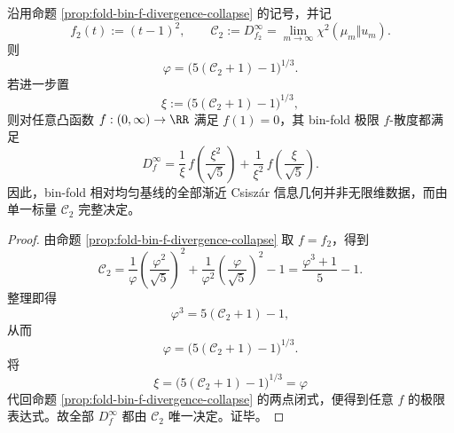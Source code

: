\begin{theorem}\label{thm:xi-chi2-complete-csiszar-geometry}
沿用命题 \ref{prop:fold-bin-f-divergence-collapse} 的记号，并记
\[
f_2(t):=(t-1)^2,
\qquad
\mathcal C_2:=D_{f_2}^\infty=\lim_{m\to\infty}\chi^2(\mu_m\Vert u_m).
\]
则
\[
\varphi=\bigl(5(\mathcal C_2+1)-1\bigr)^{1/3}.
\]
若进一步置
\[
\xi:=\bigl(5(\mathcal C_2+1)-1\bigr)^{1/3},
\]
则对任意凸函数 \(f:(0,\infty)\to\RR\) 满足 \(f(1)=0\)，其 bin-fold 极限 \(f\)-散度都满足
\[
D_f^\infty
=
\frac{1}{\xi}\,f\!\left(\frac{\xi^2}{\sqrt5}\right)
+\frac{1}{\xi^2}\,f\!\left(\frac{\xi}{\sqrt5}\right).
\]
因此，bin-fold 相对均匀基线的全部渐近 Csisz\'ar 信息几何并非无限维数据，而由单一标量 \(\mathcal C_2\) 完整决定。
\end{theorem}
\begin{proof}
由命题 \ref{prop:fold-bin-f-divergence-collapse} 取 \(f=f_2\)，得到
\[
\mathcal C_2
=
\frac{1}{\varphi}\left(\frac{\varphi^2}{\sqrt5}\right)^2
+\frac{1}{\varphi^2}\left(\frac{\varphi}{\sqrt5}\right)^2
-1
=
\frac{\varphi^3+1}{5}-1.
\]
整理即得
\[
\varphi^3=5(\mathcal C_2+1)-1,
\]
从而
\[
\varphi=\bigl(5(\mathcal C_2+1)-1\bigr)^{1/3}.
\]
将
\[
\xi=\bigl(5(\mathcal C_2+1)-1\bigr)^{1/3}=\varphi
\]
代回命题 \ref{prop:fold-bin-f-divergence-collapse} 的两点闭式，便得到任意 \(f\) 的极限表达式。故全部 \(D_f^\infty\) 都由 \(\mathcal C_2\) 唯一决定。证毕。
\end{proof}

